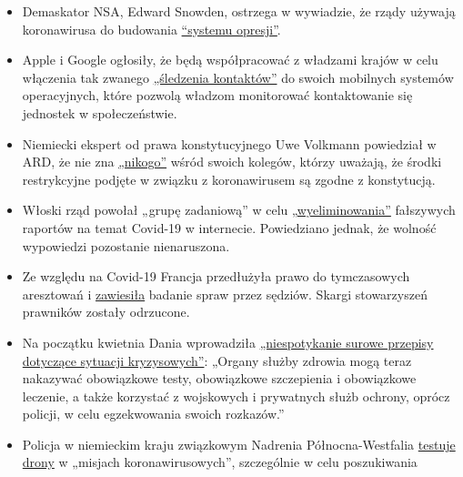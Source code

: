 \begin{itemize}
\tightlist
\item
  Demaskator NSA, Edward Snowden, ostrzega w wywiadzie, że rządy używają
  koronawirusa do budowania
  \href{https://www.vice.com/en_us/article/bvge5q/snowden-warns-governments-are-using-coronavirus-to-build-the-architecture-of-oppression}{``systemu
  opresji''}.
\item
  Apple i Google ogłosiły, że będą współpracować z władzami krajów w
  celu włączenia tak zwanego
  \href{https://www.bloomberg.com/news/articles/2020-04-10/apple-google-bring-covid-19-contact-tracing-to-3-billion-people}{„śledzenia
  kontaktów''} do swoich mobilnych systemów operacyjnych, które pozwolą
  władzom monitorować kontaktowanie się jednostek w społeczeństwie.
\item
  Niemiecki ekspert od prawa konstytucyjnego Uwe Volkmann powiedział w
  ARD, że nie zna
  \href{https://www.youtube.com/watch?v=DvzrGLvzllU}{„nikogo''} wśród
  swoich kolegów, którzy uważają, że środki restrykcyjne podjęte w
  związku z koronawirusem są zgodne z konstytucją.
\item
  Włoski rząd powołał „grupę zadaniową'' w celu
  \href{https://www.faz.net/aktuell/feuilleton/medien/corona-in-italien-das-virus-und-die-wahrheit-16714529.html}{„wyeliminowania''}
  fałszywych raportów na temat Covid-19 w internecie. Powiedziano
  jednak, że wolność wypowiedzi pozostanie nienaruszona.
\item
  Ze względu na Covid-19 Francja przedłużyła prawo do tymczasowych
  aresztowań i
  \href{https://www.lefigaro.fr/politique/coronavirus-le-conseil-d-etat-sur-la-ligne-de-crete-des-libertes-publiques-20200406}{zawiesiła}
  badanie spraw przez sędziów. Skargi stowarzyszeń prawników zostały
  odrzucone.
\item
  Na początku kwietnia Dania wprowadziła
  \href{https://www.fr.de/politik/coronavirus-sars-cov-2-daenemark-notfalls-militaer-13598503.html}{„niespotykanie
  surowe przepisy dotyczące sytuacji kryzysowych''}: „Organy służby
  zdrowia mogą teraz nakazywać obowiązkowe testy, obowiązkowe
  szczepienia i obowiązkowe leczenie, a także korzystać z wojskowych i
  prywatnych służb ochrony, oprócz policji, w celu egzekwowania swoich
  rozkazów.''
\item
  Policja w niemieckim kraju związkowym Nadrenia Północna-Westfalia
  \href{https://rp-online.de/nrw/panorama/nrw-polizei-testet-drohnen-bei-einsaetzen-wegen-corona-massnahmen_aid-50006143}{testuje
  drony} w „misjach koronawirusowych'', szczególnie w celu poszukiwania

\end{itemize}
